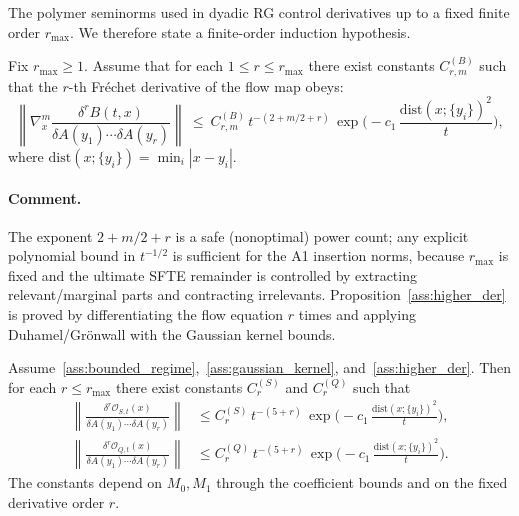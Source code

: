 The polymer seminorms used in dyadic RG control derivatives up to a fixed finite order $r_{\max}$.
We therefore state a finite-order induction hypothesis.

\begin{proposition}\label{ass:higher_der}
Fix $r_{\max}\ge 1$.
Assume that for each $1\le r\le r_{\max}$ there exist constants $C^{(B)}_{r,m}$ such that the $r$-th Fr\'echet derivative of the flow map obeys:
\begin{equation}\label{eq:high_der_B}
\left\|\nabla_x^m\frac{\delta^r B(t,x)}{\delta A(y_1)\cdots\delta A(y_r)}\right\|
\ \le\ C^{(B)}_{r,m}\, t^{-(2+m/2+r)}\,
\exp\!\Big(-c_1\,\frac{\mathrm{dist}(x;\{y_i\})^2}{t}\Big),
\end{equation}
where $\mathrm{dist}(x;\{y_i\})=\min_i |x-y_i|$.
\end{proposition}

\paragraph{Comment.}
The exponent $2+m/2+r$ is a safe (nonoptimal) power count; any explicit polynomial bound in $t^{-1/2}$ is sufficient for the A1 insertion norms,
because $r_{\max}$ is fixed and the ultimate SFTE remainder is controlled by extracting relevant/marginal parts and contracting irrelevants.
Proposition~\ref{ass:higher_der} is proved by differentiating the flow equation $r$ times and applying Duhamel/Gr\"onwall with the Gaussian kernel bounds.

\begin{corollary}\label{cor:high_der_OSOQ}
Assume~\ref{ass:bounded_regime},~\ref{ass:gaussian_kernel}, and~\ref{ass:higher_der}.
Then for each $r\le r_{\max}$ there exist constants $C^{(S)}_{r}$ and $C^{(Q)}_{r}$ such that
\begin{align}
\left\|\frac{\delta^r \mathcal O_{S,t}(x)}{\delta A(y_1)\cdots\delta A(y_r)}\right\|
&\le C^{(S)}_{r}\, t^{-(5+r)}\,
\exp\!\Big(-c_1\,\frac{\mathrm{dist}(x;\{y_i\})^2}{t}\Big),\label{eq:der_OS}\\
\left\|\frac{\delta^r \mathcal O_{Q,t}(x)}{\delta A(y_1)\cdots\delta A(y_r)}\right\|
&\le C^{(Q)}_{r}\, t^{-(5+r)}\,
\exp\!\Big(-c_1\,\frac{\mathrm{dist}(x;\{y_i\})^2}{t}\Big).\label{eq:der_OQ}
\end{align}
The constants depend on $M_0,M_1$ through the coefficient bounds and on the fixed derivative order $r$.
\end{corollary}

